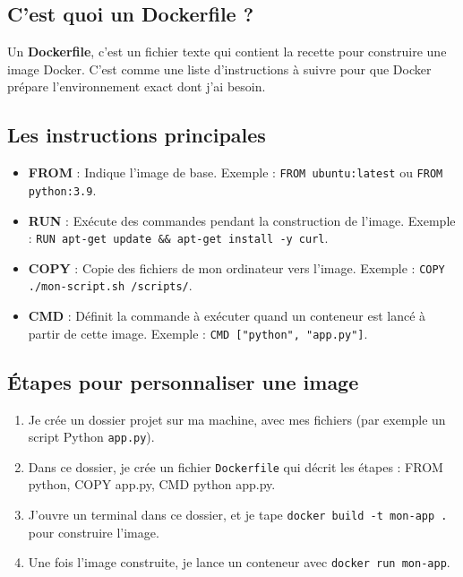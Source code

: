 \documentclass[12pt,a4paper]{article}
\begin{document}
\subsection{C'est quoi un Dockerfile ?}

Un \textbf{Dockerfile}, c’est un fichier texte qui contient la recette pour construire une image Docker. C’est comme une liste d’instructions à suivre pour que Docker prépare l’environnement exact dont j’ai besoin.

\subsection{Les instructions principales}

\begin{itemize}
    \item \textbf{FROM} : Indique l’image de base. Exemple : \texttt{FROM ubuntu:latest} ou \texttt{FROM python:3.9}.
    \item \textbf{RUN} : Exécute des commandes pendant la construction de l’image. Exemple : \texttt{RUN apt-get update \&\& apt-get install -y curl}.
    \item \textbf{COPY} : Copie des fichiers de mon ordinateur vers l’image. Exemple : \texttt{COPY ./mon-script.sh /scripts/}.
    \item \textbf{CMD} : Définit la commande à exécuter quand un conteneur est lancé à partir de cette image. Exemple : \texttt{CMD ["python", "app.py"]}.
\end{itemize}

\subsection{Étapes pour personnaliser une image}

\begin{enumerate}
    \item Je crée un dossier projet sur ma machine, avec mes fichiers (par exemple un script Python \texttt{app.py}).
    \item Dans ce dossier, je crée un fichier \texttt{Dockerfile} qui décrit les étapes : FROM python, COPY app.py, CMD python app.py.
    \item J’ouvre un terminal dans ce dossier, et je tape \texttt{docker build -t mon-app .} pour construire l’image.
    \item Une fois l’image construite, je lance un conteneur avec \texttt{docker run mon-app}.
\end{enumerate}
\end{document}
